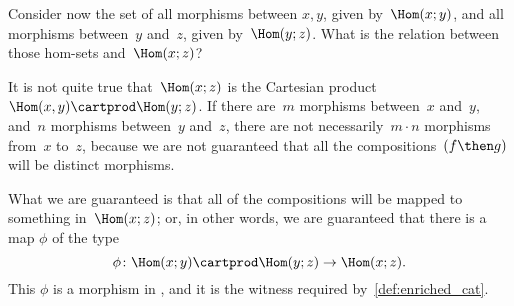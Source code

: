 {\begin{example}
        Consider now the set of all morphisms between $x, y$, given by~$\Hom(x;y)$, and all morphisms between~$y$ and~$z$, given by~$\Hom(y; z)$.
        What is the relation between those hom-sets and~$\Hom(x; z)$?

        It is not quite true that~$\Hom(x; z)$ is the Cartesian product~$\Hom(x, y) \cartprod \Hom(y; z)$.
        If there are~$m$ morphisms between~$x$ and~$y$, and~$n$ morphisms between~$y$ and~$z$, there are not necessarily~$m \cdot n$ morphisms from~$x$ to~$z$, because we are not guaranteed that all the compositions~$(f\then g)$ will be distinct morphisms.

        What we are guaranteed is that all of the compositions will be mapped to something in~$\Hom(x; z)$; or, in other words, we are guaranteed that there is a map $\phi$ of the type
        \begin{equation*}
            \phi \colon \Hom(x; y) \cartprod \Hom(y; z) \rightarrow \Hom(x; z).
        \end{equation*}
        This $\phi$ is a morphism in \Set, and it is the witness required by~\cref{def:enriched_cat}.

    \end{example}
}

